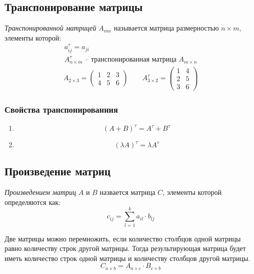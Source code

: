 \subsection{Транспонирование матрицы}

\begin{definition}
  \textit{Транспонированной матрицей} $A_{mn}$ называется матрица размерностью $n \times  m$, элементы которой:
  \begin{gather*}
    a^\tau_{ij} = a_{ji} \\
    A_{n \times m}^\tau \text{ -- транспонированная матрица } A_{m \times n}
  \end{gather*}
  \begin{gather*}
    A_{2 \times 3} = 
    \begin{pmatrix}
      1 & 2 & 3 \\
      4 & 5 & 6
    \end{pmatrix} \qquad
    A^\tau_{3 \times 2} = 
    \begin{pmatrix}
      1 & 4 \\
      2 & 5 \\
      3 & 6
    \end{pmatrix}
  \end{gather*}
\end{definition}

\subsubsection{Свойства транспонированния}

\begin{enumerate}
  \item \[
      (A + B)^\tau = A^\tau + B^\tau
  \] 

  \item \[
    (\lambda A)^\tau = \lambda A^\tau
\] 
\end{enumerate}

\subsection{Произведение матриц}

\begin{definition}
  \textit{Произведением матриц} $A$ и $B$ назвается матрица $C$, элементы которой определяются как: \[
    c_{ij} = \sum_{l=1}^{k} a_{il} \cdot b_{lj}
  \] 
\end{definition}

\begin{note}
  Две матрицы можно перемножить, если количество столбцов одной матрицы равно количеству строк другой матрицы. Тогда результирующая матрица будет иметь количество строк одной матрицы и количеству столбцов другой матрицы. \[
    C_{a \times b} = A_{a \times c} \cdot B_{c \times b}
  \] 
\end{note}

